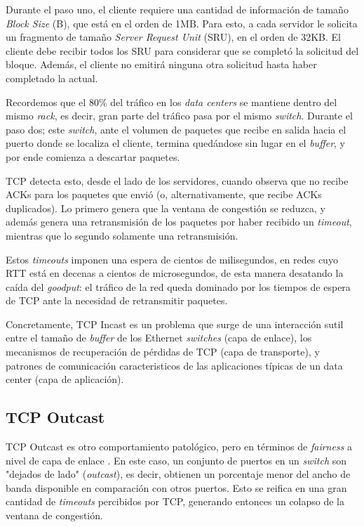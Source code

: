 \documentclass[runningheads,a4paper]{llncs}
\begin{document}
Durante el paso uno, el cliente requiere una cantidad de información de tamaño \textit{Block Size} (B), que está en el orden de 1MB. Para esto, a cada servidor le solicita un fragmento de tamaño \textit{Server Request Unit} (SRU), en el orden de 32KB. El cliente debe recibir todos los SRU para considerar que se completó la solicitud del bloque. Además, el cliente no emitirá ninguna otra solicitud hasta haber completado la actual.

Recordemos que el 80\% del tráfico en los \textit{data centers} se mantiene dentro del mismo \textit{rack}, es decir, gran parte del tráfico pasa por el mismo \textit{switch}. Durante el paso dos; este \textit{switch}, ante el volumen de paquetes que recibe en salida hacia el puerto donde se localiza el cliente, termina quedándose sin lugar en el \textit{buffer}, y por ende comienza a descartar paquetes.

TCP detecta esto, desde el lado de los servidores, cuando observa que no recibe ACKs para los paquetes que envió (o, alternativamente, que recibe ACKs duplicados). Lo primero genera que la ventana de congestión se reduzca, y además genera una retransmisión de los paquetes por haber recibido un \textit{timeout}, mientras que lo segundo solamente una retransmisión. 

Estos \textit{timeouts} imponen una espera de cientos de milisegundos, en redes cuyo RTT está en decenas a cientos de microsegundos, de esta manera desatando la caída del \textit{goodput}: el tráfico de la red queda dominado por los tiempos de espera de TCP ante la necesidad de retransmitir paquetes.

Concretamente, TCP Incast es un problema que surge de una interacción sutil entre el tamaño de \textit{buffer} de los Ethernet \textit{switches} (capa de enlace), los mecanismos de recuperación de pérdidas de TCP (capa de transporte), y patrones de comunicación caracteristicos de las aplicaciones típicas de un data center (capa de aplicación).

\subsection{TCP Outcast}

TCP Outcast es otro comportamiento patológico, pero en términos de \textit{fairness} a nivel de capa de enlace \cite{Prakash_Outcast_2012}. En este caso, un conjunto de puertos en un \textit{switch} son "dejados de lado" (\textit{outcast}), es decir, obtienen un porcentaje menor del ancho de banda disponible en comparación con otros puertos. Esto se reifica en una gran cantidad de \textit{timeouts} percibidos por TCP, generando entonces un colapso de la ventana de congestión.
\end{document}
